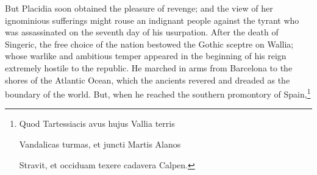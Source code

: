 But Placidia soon obtained the pleasure of revenge; and the view of her ignominious sufferings might rouse an indignant people against the tyrant who was assassinated on the seventh day of his usurpation. After the death of Singeric, the free choice of the nation bestowed the Gothic sceptre on Wallia; whose warlike and ambitious temper appeared in the beginning of his reign extremely hostile to the republic. He marched in arms from Barcelona to the shores of the Atlantic Ocean, which the ancients revered and dreaded as the boundary of the world. But, when he reached the southern promontory of Spain,\footnote{Quod Tartessiacis avus hujus Vallia terris

Vandalicas turmas, et juncti Martis Alanos

Stravit, et occiduam texere cadavera Calpen.

}
